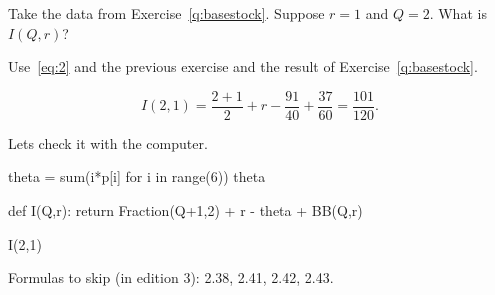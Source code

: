 \begin{exercise}
  Take the data from Exercise~\ref{q:basestock}. Suppose $r=1$ and $Q=2$. What is $I(Q,r)$?

\begin{solution}
  Use~\eqref{eq:2} and the previous exercise and the result of Exercise~\ref{q:basestock}.

  \begin{equation*}
    I(2,1)  = \frac{2+1}2 + r - \frac{91}{40}+ \frac{37}{60} = \frac{101}{120}.
  \end{equation*}

Lets check it with the computer.
\begin{pyconsole}
theta = sum(i*p[i] for i in range(6))
theta

def I(Q,r):
    return Fraction(Q+1,2) + r - theta + BB(Q,r)

I(2,1)
\end{pyconsole}
\end{solution}
\end{exercise}

Formulas to skip (in edition 3): 2.38, 2.41, 2.42, 2.43.



\clearpage



